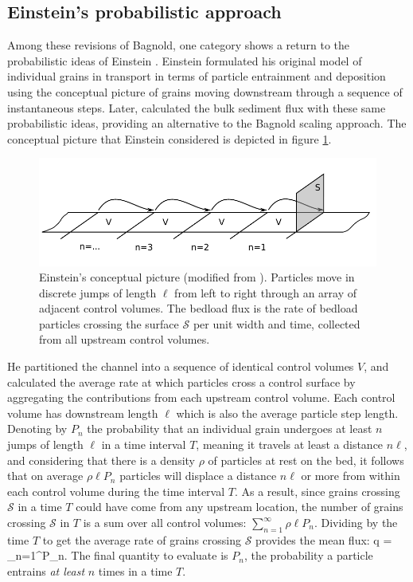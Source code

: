 \subsection{Einstein's probabilistic approach}

Among these revisions of Bagnold, one category shows a return to the probabilistic ideas of Einstein \citep{Parker2003,Ancey2006}.
Einstein formulated his original model of individual grains in transport \citep{Einstein1937} in terms of particle entrainment and deposition using the conceptual picture of grains moving downstream through a sequence of instantaneous steps.
Later, \citet{Einstein1942,Einstein1950} calculated the bulk sediment flux with these same probabilistic ideas, providing an alternative to the Bagnold scaling approach.
The conceptual picture that Einstein considered is depicted in figure \ref{fig:einsteinFluxConcept}.
 \begin{figure}[!htbp]
	\includegraphics[width=\linewidth,keepaspectratio]{./figures/ch1/yalinDrawing.pdf}
	\caption{Einstein’s conceptual picture (modified from \citet{Yalin1972}). Particles move in discrete jumps of length $\ell$ from
left to right through an array of adjacent control volumes. The bedload flux is the rate of bedload particles crossing
the surface $\mathcal{S}$ per unit width and time, collected from all upstream control volumes.}
	\label{fig:einsteinFluxConcept}
\end{figure}

He partitioned the channel into a sequence of identical control volumes $V$, and calculated the average rate at which particles cross a control surface by aggregating the contributions from each upstream control volume.
Each control volume has downstream length $\ell$ which is also the average particle step length.
Denoting by $P_n$ the probability that an individual grain undergoes at least $n$ jumps of length $\ell$ in a time interval $T$, meaning it travels at least a distance $n \ell$, and considering that there is a density $\rho$ of particles at rest on the bed, it follows that on average $\rho \ell P_n$ particles will displace a distance $n \ell$ or more from within each control volume during the time interval $T$. 
As a result, since grains crossing $\mathcal{S}$ in a time $T$ could have come from any upstream location, the number of grains crossing $\mathcal{S}$ in $T$ is a sum over all control volumes: $\sum_{n=1}^\infty \rho \ell P_n$.
Dividing by the time $T$ to get the average rate of grains crossing $\mathcal{S}$ provides the mean flux:
\be q =  \sum_{n=1}^\infty P_n. \label{eq:einflux} \ee
The final quantity to evaluate is $P_n$, the probability a particle entrains \textit{at least} $n$ times in a time $T$.

